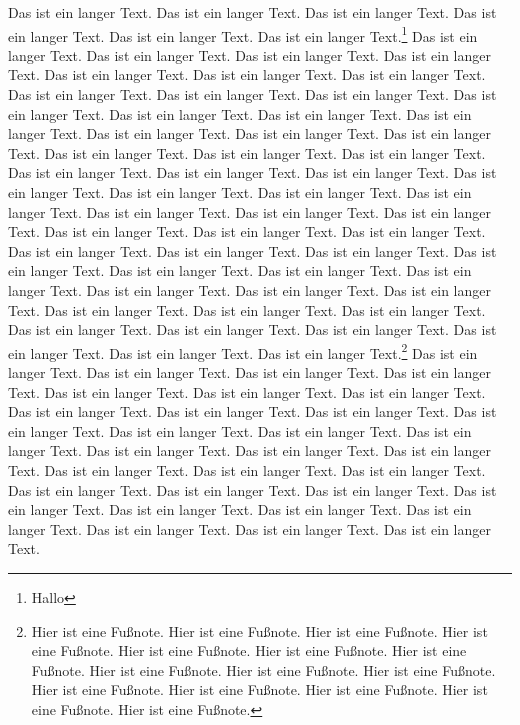 \documentclass[twoside]{article}
\begin{document}
Das ist ein langer Text. Das ist ein langer Text.
Das ist ein langer Text. Das ist ein langer Text.
Das ist ein langer Text. Das ist ein langer Text.\footnote{Hallo}
Das ist ein langer Text. Das ist ein langer Text.
Das ist ein langer Text. Das ist ein langer Text.
Das ist ein langer Text. Das ist ein langer Text.
Das ist ein langer Text. Das ist ein langer Text.
Das ist ein langer Text. Das ist ein langer Text.
Das ist ein langer Text. Das ist ein langer Text.
Das ist ein langer Text. Das ist ein langer Text.
Das ist ein langer Text. Das ist ein langer Text.
Das ist ein langer Text. Das ist ein langer Text.
Das ist ein langer Text. Das ist ein langer Text.
Das ist ein langer Text. Das ist ein langer Text.
Das ist ein langer Text. Das ist ein langer Text.
Das ist ein langer Text. Das ist ein langer Text.
Das ist ein langer Text. Das ist ein langer Text.
Das ist ein langer Text. Das ist ein langer Text.
Das ist ein langer Text. Das ist ein langer Text.
Das ist ein langer Text. Das ist ein langer Text.
Das ist ein langer Text. Das ist ein langer Text.
Das ist ein langer Text. Das ist ein langer Text.
Das ist ein langer Text. Das ist ein langer Text.
Das ist ein langer Text. Das ist ein langer Text.
Das ist ein langer Text. Das ist ein langer Text.
Das ist ein langer Text. Das ist ein langer Text.
Das ist ein langer Text. Das ist ein langer Text.
Das ist ein langer Text. Das ist ein langer Text.
Das ist ein langer Text. Das ist ein langer Text.\footnote{%
  Hier ist eine Fu\ss note. Hier ist eine Fu\ss note.
  Hier ist eine Fu\ss note. Hier ist eine Fu\ss note.
  Hier ist eine Fu\ss note. Hier ist eine Fu\ss note.
  Hier ist eine Fu\ss note. Hier ist eine Fu\ss note.
  Hier ist eine Fu\ss note. Hier ist eine Fu\ss note.
  Hier ist eine Fu\ss note. Hier ist eine Fu\ss note.
  Hier ist eine Fu\ss note. Hier ist eine Fu\ss note.
  Hier ist eine Fu\ss note.}
Das ist ein langer Text. Das ist ein langer Text.
Das ist ein langer Text. Das ist ein langer Text.
Das ist ein langer Text. Das ist ein langer Text.
Das ist ein langer Text. Das ist ein langer Text.
Das ist ein langer Text. Das ist ein langer Text.
Das ist ein langer Text. Das ist ein langer Text.
Das ist ein langer Text. Das ist ein langer Text.
Das ist ein langer Text. Das ist ein langer Text.
Das ist ein langer Text. Das ist ein langer Text.
Das ist ein langer Text. Das ist ein langer Text.
Das ist ein langer Text. Das ist ein langer Text.
Das ist ein langer Text. Das ist ein langer Text.
Das ist ein langer Text. Das ist ein langer Text.
Das ist ein langer Text. Das ist ein langer Text.
Das ist ein langer Text. Das ist ein langer Text.
\end{document}
